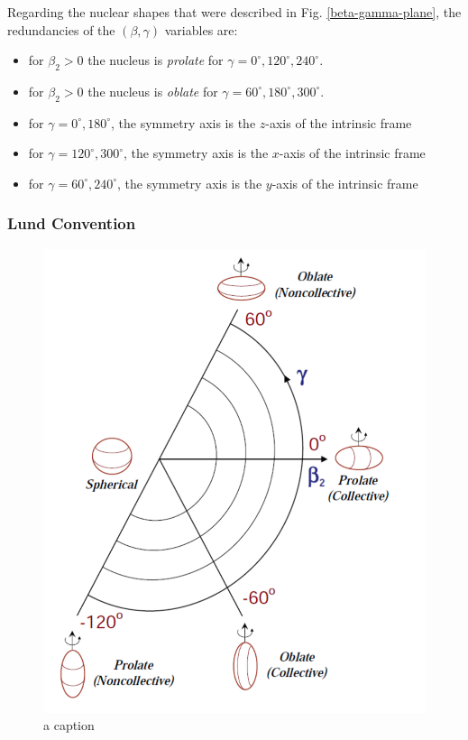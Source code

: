 Regarding the nuclear shapes that were described in Fig. \ref{beta-gamma-plane}, the redundancies of the $(\beta,\gamma)$ variables are:
\begin{itemize}
    \item for $\beta_2>0$ the nucleus is \emph{prolate} for $\gamma=0^\circ,120^\circ,240^\circ$.
    \item for $\beta_2>0$ the nucleus is \emph{oblate} for $\gamma=60^\circ,180^\circ,300^\circ$.
    \item for $\gamma=0^\circ,180^\circ$, the symmetry axis is the $z$-axis of the intrinsic frame
    \item for $\gamma=120^\circ,300^\circ$, the symmetry axis is the $x$-axis of the intrinsic frame
    \item for $\gamma=60^\circ,240^\circ$, the symmetry axis is the $y$-axis of the intrinsic frame
\end{itemize}

\subsubsection{Lund Convention}

\begin{figure}
    \centering
    \includegraphics[scale=0.3]{Chapters/Figures/lund-convention-plot.pdf}
    \caption{a caption}
    \label{a-label}
\end{figure}

